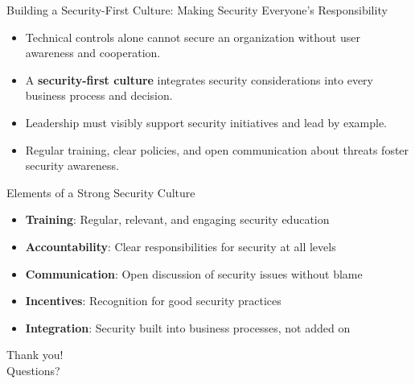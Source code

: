 \documentclass{beamer}
\begin{document}
\begin{frame}{Building a Security-First Culture: Making Security Everyone's Responsibility}
\begin{itemize}
    \item Technical controls alone cannot secure an organization without user awareness and cooperation.
    \item A \textbf{security-first culture} integrates security considerations into every business process and decision.
    \item Leadership must visibly support security initiatives and lead by example.
    \item Regular training, clear policies, and open communication about threats foster security awareness.
\end{itemize}

\begin{block}{Elements of a Strong Security Culture}
\begin{itemize}
    \item \textbf{Training}: Regular, relevant, and engaging security education
    \item \textbf{Accountability}: Clear responsibilities for security at all levels
    \item \textbf{Communication}: Open discussion of security issues without blame
    \item \textbf{Incentives}: Recognition for good security practices
    \item \textbf{Integration}: Security built into business processes, not added on
\end{itemize}
\end{block}

\begin{center}
\Large Thank you!\\
\normalsize Questions?
\end{center}
\end{frame}
\end{document}
